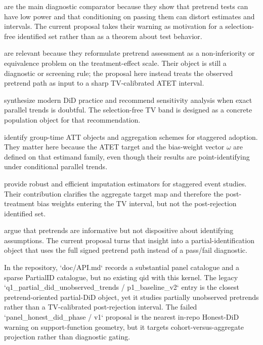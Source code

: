 \documentclass[11pt]{article}
\theoremstyle{definition}
\theoremstyle{plain}
\theoremstyle{remark}
\begin{document}
\citet{Roth2022PretestCaution} are the main diagnostic comparator because they show that pretrend tests can have low power and that conditioning on passing them can distort estimates and intervals. The current proposal takes their warning as motivation for a selection-free identified set rather than as a theorem about test behavior.

\citet{BilinskiHatfield2026NonInferiority} are relevant because they reformulate pretrend assessment as a non-inferiority or equivalence problem on the treatment-effect scale. Their object is still a diagnostic or screening rule; the proposal here instead treats the observed pretrend path as input to a sharp TV-calibrated ATET interval.

\citet{RothSantAnnaBilinskiPoe2023TrendingDiD} synthesize modern DiD practice and recommend sensitivity analysis when exact parallel trends is doubtful. The selection-free TV band is designed as a concrete population object for that recommendation.

\citet{CallawaySantAnna2021MultiplePeriods} identify group-time ATT objects and aggregation schemes for staggered adoption. They matter here because the ATET target and the bias-weight vector \(\omega\) are defined on that estimand family, even though their results are point-identifying under conditional parallel trends.

\citet{BorusyakJaravelSpiess2024EventStudies} provide robust and efficient imputation estimators for staggered event studies. Their contribution clarifies the aggregate target map and therefore the post-treatment bias weights entering the TV interval, but not the post-rejection identified set.

\citet{KahnLangLang2020PromisePitfalls} argue that pretrends are informative but not dispositive about identifying assumptions. The current proposal turns that insight into a partial-identification object that uses the full signed pretrend path instead of a pass/fail diagnostic.

In the repository, `doc/API.md` records a substantial panel catalogue and a sparse PartialID catalogue, but no existing qid with this kernel. The legacy `q1_partial_did_unobserved_trends / p1_baseline_v2` entry is the closest pretrend-oriented partial-DiD object, yet it studies partially unobserved pretrends rather than a TV-calibrated post-rejection interval. The failed `panel_honest_did_phase / v1` proposal is the nearest in-repo Honest-DiD warning on support-function geometry, but it targets cohort-versus-aggregate projection rather than diagnostic gating.
\end{document}

